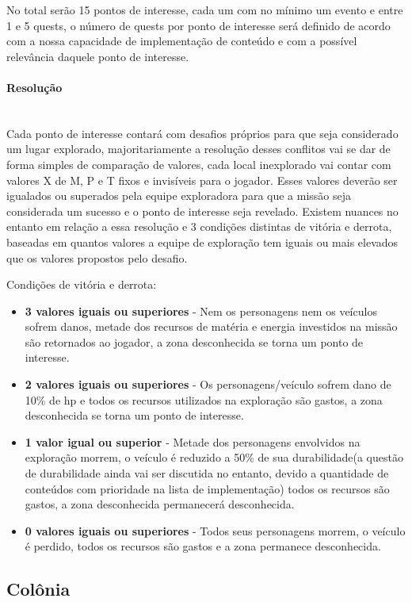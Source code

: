\documentclass[11pt]{article} %
\begin{document}
No total serão 15 pontos de interesse, cada um com no mínimo um evento e entre 1 e 5 quests, o número de quests por ponto de interesse será definido de acordo com a nossa capacidade de implementação de conteúdo e com a possível relevância daquele ponto de interesse.

\paragraph{Resolução} \mbox{}\\
Cada ponto de interesse contará com desafios próprios para que seja considerado um lugar explorado, majoritariamente a resolução desses conflitos vai se dar de forma simples de comparação de valores, cada local inexplorado vai contar com valores X de M, P e T fixos e invisíveis para o jogador. Esses valores deverão ser igualados ou superados pela equipe exploradora para que a missão seja considerada um sucesso e o ponto de interesse seja revelado. Existem nuances no entanto em relação a essa resolução e 3 condições distintas de vitória e derrota, baseadas em quantos valores a equipe de exploração tem iguais ou mais elevados que os valores propostos pelo desafio.

Condições de vitória e derrota:
\begin{itemize}
  \item \textbf{3 valores iguais ou superiores} - Nem os personagens nem os veículos sofrem danos, metade dos recursos de matéria e energia investidos na missão são retornados ao jogador, a zona desconhecida se torna um ponto de interesse.
  \item \textbf{2 valores iguais ou superiores} - Os personagens/veículo sofrem dano de 10\% de hp e todos os recursos utilizados na exploração são gastos, a zona desconhecida se torna um ponto de interesse.
  \item \textbf{1 valor igual ou superior} - Metade dos personagens envolvidos na exploração morrem, o veículo é reduzido a 50\% de sua durabilidade(a questão de durabilidade ainda vai ser discutida no entanto, devido a quantidade de conteúdos com prioridade na lista de implementação) todos os recursos são gastos, a zona desconhecida permanecerá desconhecida.
  \item \textbf{0 valores iguais ou superiores} - Todos seus personagens morrem, o veículo é perdido, todos os recursos são gastos e a zona permanece desconhecida.
\end{itemize}

\subsection{Colônia}
\end{document}
